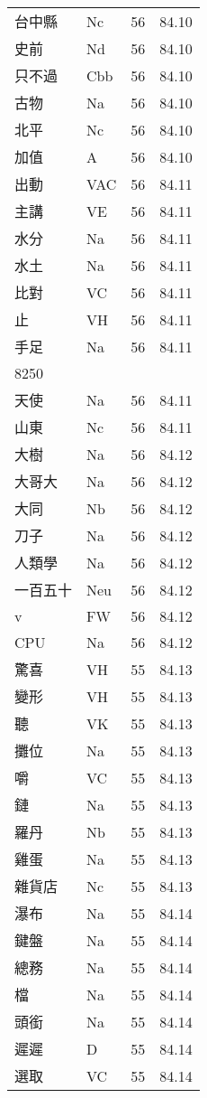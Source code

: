 \documentclass[twocolumn]{book}
\begin{document}
\begin{supertabular}{llrr}
台中縣 & Nc & 56 &  84.10\\
史前 & Nd & 56 &  84.10\\
只不過 & Cbb & 56 &  84.10\\
古物 & Na & 56 &  84.10\\
北平 & Nc & 56 &  84.10\\
加值 & A & 56 &  84.10\\
出動 & VAC & 56 &  84.11\\
主講 & VE & 56 &  84.11\\
水分 & Na & 56 &  84.11\\
水土 & Na & 56 &  84.11\\
比對 & VC & 56 &  84.11\\
止 & VH & 56 &  84.11\\
手足 & Na & 56 &  84.11\\
8250\\
天使 & Na & 56 &  84.11\\
山東 & Nc & 56 &  84.11\\
大樹 & Na & 56 &  84.12\\
大哥大 & Na & 56 &  84.12\\
大同 & Nb & 56 &  84.12\\
刀子 & Na & 56 &  84.12\\
人類學 & Na & 56 &  84.12\\
一百五十 & Neu & 56 &  84.12\\
v & FW & 56 &  84.12\\
CPU & Na & 56 &  84.12\\
驚喜 & VH & 55 &  84.13\\
變形 & VH & 55 &  84.13\\
聽 & VK & 55 &  84.13\\
攤位 & Na & 55 &  84.13\\
嚼 & VC & 55 &  84.13\\
鏈 & Na & 55 &  84.13\\
羅丹 & Nb & 55 &  84.13\\
雞蛋 & Na & 55 &  84.13\\
雜貨店 & Nc & 55 &  84.13\\
瀑布 & Na & 55 &  84.14\\
鍵盤 & Na & 55 &  84.14\\
總務 & Na & 55 &  84.14\\
檔 & Na & 55 &  84.14\\
頭銜 & Na & 55 &  84.14\\
遲遲 & D & 55 &  84.14\\
選取 & VC & 55 &  84.14\\

\end{supertabular}
\end{document}
